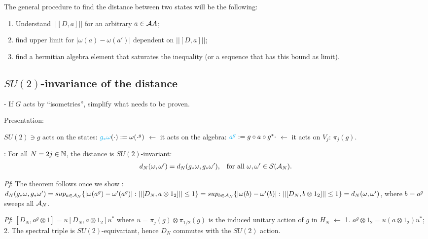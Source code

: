 The general procedure to find the distance between two states will be the following: 

    \begin{enumerate}
    
    \item Understand $||[D, a]||$ for an arbitrary $a \in \mathcal A A$; 
    
    \item find upper limit for $|\omega(a) - \omega(a')|$ dependent on $||[D, a]||$;
    
    \item find a hermitian algebra element that saturates the inequality (or a sequence that has this bound as limit).
    
    \end{enumerate} 
\subsection{$SU(2)$-invariance of the distance}

{\color{gray} 
 - If $G$ acts by ``isometries'', simplify what needs to be proven.

Presentation:

$SU(2) \ni g$ acts on the states: $\textcolor{cyan}{g_*\omega}(\cdot) := \omega(\cdot^g)$ $\longleftarrow$ it acts on the algebra: $\textcolor{cyan}{a^g}:= g\circ a \circ g^* \cdot$ $\longleftarrow$ it acts on $V_j$: $\pi_j(g)$.

\textbf{}: For all $N = 2j \in \mathbb{N}$, the distance is $SU(2)$-invariant: 
\begin{align}
    d_N(\omega, \omega') &= d_N(g_* \omega, g_*\omega'), & \text{for all $\omega, \omega' \in \mathcal S(\mathcal A_N)$}.
\end{align}

\textit{Pf}: The theorem follows once we show 
    \rtext{$||[D_N, a^g]|| = ||[D_N, a]||$}:
$d_N(g_* \omega, g_* \omega') = sup_{a \in \mathcal A_N}\{ |\omega(a^g) - \omega'(a^g)|: ||[D_N, a \otimes 1_2]|| \leq 1 \} = sup_{b \in \mathcal A_N}\{ |\omega(b) - \omega'(b)|: ||[D_N, b \otimes 1_2]|| \leq 1 \} = d_N(\omega, \omega')$, where $b = a^g$ sweeps all $\mathcal A_N$.

\textit{Pf}: $[D_N, a^g \otimes 1] = u[D_N, a \otimes 1_2]u^*$ where $u = \pi_j(g) \otimes \pi_{1/2}(g)$ is the induced unitary action of $g$ in $H_N$ $\xleftarrow{}$
1. $a^g \otimes 1_2 = u(a \otimes 1_2)u^*$;
2. The spectral triple is $SU(2)$-equivariant, hence $D_N$ commutes with the $SU(2)$ action.
}

